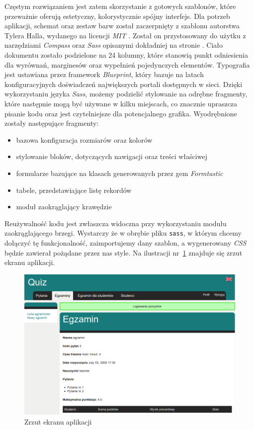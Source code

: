 \documentclass[12pt,twoside]{report}
\begin{document}
Częstym rozwiązaniem jest zatem skorzystanie z gotowych szablonów, które przeważnie oferują
estetyczny, kolorystycznie spójny interfejs. Dla potrzeb aplikacji, schemat oraz zestaw
barw został zaczerpnięty z szablonu autorstwa Tylera Halla, wydanego na licencji
\emph{MIT} \cite{yui-app-theme}. Został on przystosowany do użytku z narzędziami
\emph{Compass} oraz \emph{Sass} opisanymi dokładniej na stronie \pageref{sec:compass}.
Ciało dokumentu zostało podzielone na 24 kolumny, które stanowią punkt odniesienia dla
wyrównań, marginesów oraz wypełnień pojedynczych elementów. Typografia jest ustawiana
przez framework \emph{Blueprint}, który bazuje na latach konfiguracyjnych doświadczeń
największych portali dostępnych w sieci. Dzięki wykorzystaniu języka \emph{Sass}, możemy
podzielić stylowanie na odrębne fragmenty, które następnie mogą być używane w kilku
miejscach, co znacznie upraszcza pisanie kodu oraz jest czytelniejsze dla potencjalnego
grafika. Wyodrębnione zostały następujące fragmenty:

\begin{itemize}
  \item{bazowa konfiguracja rozmiarów oraz kolorów}
  \item{stylowanie bloków, dotyczących nawigacji oraz treści właściwej}
  \item{formularze bazujące na klasach generowanych przez gem \emph{Formtastic}}
  \item{tabele, przedstawiające listę rekordów}
  \item{moduł zaokrąglający krawędzie}
\end{itemize}


Reużywalność kodu jest zwłaszcza widoczna przy wykorzystaniu modułu zaokrąglającego
brzegi. Wystarczy że w obrębie pliku \texttt{sass}, w którym chcemy dołączyć tę
funkcjonalność, zaimportujemy dany szablon, a wygenerowany \emph{CSS} będzie zawierał
pożądane przez nas style. Na ilustracji nr~\ref{fig:layout} znajduje się zrzut ekranu
aplikacji.

\begin{figure}[ht]
  \begin{center}
    \includegraphics[width=1\linewidth]{images/layout.png}
  \end{center}
  \caption{Zrzut ekranu aplikacji}
  \label{fig:layout}
\end{figure}
\end{document}

